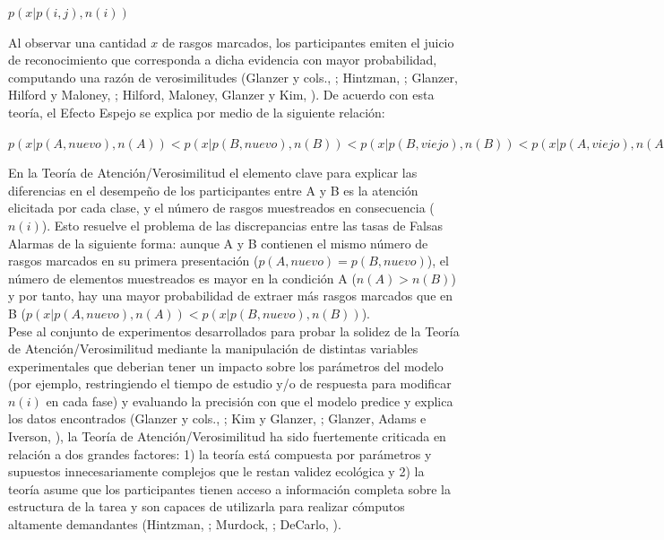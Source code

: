 \begin{center}
$p(x|p(i,j),n(i))$\\
\end{center}

Al observar una cantidad $x$ de rasgos marcados, los participantes emiten el juicio de reconocimiento que corresponda a dicha evidencia con mayor probabilidad, computando una razón de verosimilitudes (Glanzer y cols., \citeyear{Glanzer1993}; Hintzman, \citeyear{Hintzman1994}; Glanzer, Hilford y Maloney, \citeyear{Glanzer2009}; Hilford, Maloney, Glanzer y Kim, \citeyear{Hilford2015}). De acuerdo con esta teoría, el Efecto Espejo se explica por medio de la siguiente relación:

\begin{center}
$p(x|p(A,nuevo),n(A)) < p(x|p(B,nuevo),n(B)) < p(x|p(B,viejo),n(B)) < p(x|p(A,viejo),n(A))$\\
\end{center}

En la Teoría de Atención/Verosimilitud el elemento clave para explicar las diferencias en el desempeño de los participantes entre A y B es la atención elicitada por cada clase, y el número de rasgos muestreados en consecuencia ($n(i)$). Esto resuelve el problema de las discrepancias entre las tasas de Falsas Alarmas de la siguiente forma: aunque A y B contienen el mismo número de rasgos marcados en su primera presentación ($p(A,nuevo) = p(B,nuevo)$), el número de elementos muestreados es mayor en la condición A ($n(A) > n(B)$) y por tanto, hay una mayor probabilidad de extraer más rasgos marcados que en B ($p(x|p(A,nuevo),n(A)) < p(x|p(B,nuevo),n(B))$).\\

Pese al conjunto de experimentos desarrollados para probar la solidez de la Teoría de Atención/Verosimilitud mediante la manipulación de distintas variables experimentales que deberian tener un impacto sobre los parámetros del modelo (por ejemplo, restringiendo el tiempo de estudio y/o de respuesta para modificar $n(i)$ en cada fase) y evaluando la precisión con que el modelo predice y explica los datos encontrados (Glanzer y cols., \citeyear{Glanzer1993}; Kim y Glanzer, \citeyear{Kim1993}; Glanzer, Adams e Iverson, \citeyear{Glanzer1991}), la Teoría de Atención/Verosimilitud ha sido fuertemente criticada en relación a dos grandes factores: 1) la teoría está compuesta por parámetros y supuestos innecesariamente complejos que le restan validez ecológica y 2) la teoría asume que los participantes tienen acceso a información completa sobre la estructura de la tarea y son capaces de utilizarla para realizar cómputos altamente demandantes (Hintzman, \citeyear{Hintzman1994}; Murdock, \citeyear{Murdock1998}; DeCarlo, \citeyear{DeCarlo2007}).\\

